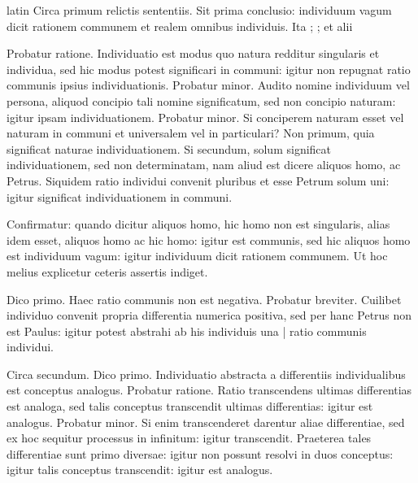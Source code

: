 \begin{otherlanguage*}{latin}
\pstart
 Circa primum relictis sententiis. Sit prima  conclusio: individuum vagum dicit rationem communem et realem omnibus individuis. Ita ; ;  et alii 
\pend

\pstart
 Probatur ratione. Individuatio est modus quo natura redditur singularis et individua, sed hic modus potest significari in communi: igitur non repugnat ratio communis ipsius individuationis. Probatur minor. Audito nomine individuum vel persona, aliquod concipio tali nomine significatum, sed non concipio naturam: igitur ipsam individuationem. Probatur minor. Si conciperem naturam esset vel naturam in communi et universalem vel in particulari? Non primum, quia significat naturae individuationem. Si secundum, solum significat individuationem, sed non determinatam, nam aliud est dicere aliquos homo, ac Petrus. Siquidem ratio individui convenit pluribus et esse Petrum solum uni: igitur significat individuationem in communi. 
\pend

\pstart
 Confirmatur: quando dicitur aliquos homo, hic homo non est singularis, alias idem esset, aliquos homo ac hic homo: igitur est communis, sed hic aliquos homo est individuum vagum: igitur individuum dicit rationem communem. Ut hoc melius explicetur ceteris assertis indiget. 
\pend

\pstart
 Dico primo. Haec ratio communis non est negativa. Probatur breviter. Cuilibet individuo convenit propria differentia numerica positiva, sed per hanc Petrus non est Paulus: igitur potest abstrahi ab his individuis una \textnormal{|}   ratio communis individui. 
\pend

\pstart
 Circa secundum. Dico primo. Individuatio abstracta a differentiis individualibus est conceptus analogus. Probatur ratione. Ratio transcendens ultimas differentias est analoga, sed talis conceptus transcendit ultimas differentias: igitur est analogus. Probatur minor. Si enim transcenderet darentur aliae differentiae, sed ex hoc sequitur processus in infinitum: igitur transcendit. Praeterea tales differentiae sunt primo diversae: igitur non possunt resolvi in duos conceptus: igitur talis conceptus transcendit: igitur est analogus. 
\pend


\end{otherlanguage*}

